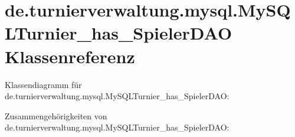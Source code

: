 \hypertarget{classde_1_1turnierverwaltung_1_1mysql_1_1_my_s_q_l_turnier__has___spieler_d_a_o}{}\section{de.\+turnierverwaltung.\+mysql.\+My\+S\+Q\+L\+Turnier\+\_\+has\+\_\+\+Spieler\+D\+AO Klassenreferenz}
\label{classde_1_1turnierverwaltung_1_1mysql_1_1_my_s_q_l_turnier__has___spieler_d_a_o}


Klassendiagramm für de.\+turnierverwaltung.\+mysql.\+My\+S\+Q\+L\+Turnier\+\_\+has\+\_\+\+Spieler\+D\+AO\+:


Zusammengehörigkeiten von de.\+turnierverwaltung.\+mysql.\+My\+S\+Q\+L\+Turnier\+\_\+has\+\_\+\+Spieler\+D\+AO\+:
